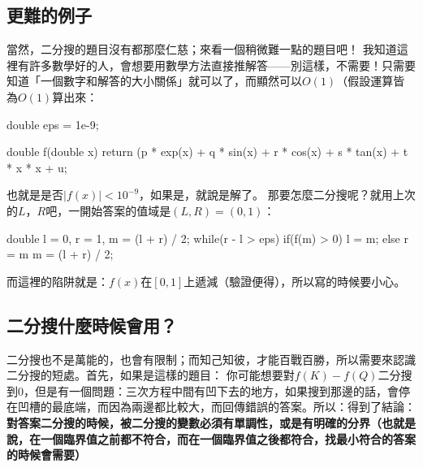 	\subsection{更難的例子}
		當然，二分搜的題目沒有都那麼仁慈；來看一個稍微難一點的題目吧！
		我知道這裡有許多數學好的人，會想要用數學方法直接推解答——別這樣，不需要！只需要知道「一個數字和解答的大小關係」就可以了，而顯然可以$O(1)$（假設運算皆為$O(1)$算出來：
		\begin{C++}
double eps = 1e-9;

double f(double x){
	return (p * exp(x) + q * sin(x) + r * cos(x) + s * tan(x) + t * x * x + u;	
}
		\end{C++}
		也就是是否$|f(x)| < 10^{-9}$，如果是，就說是解了。
		那要怎麼二分搜呢？就用上次的$L$，$R$吧，一開始答案的值域是$(L, R) = (0, 1)$：
		\begin{C++}
double l = 0, r = 1, m = (l + r) / 2;
while(r - l > eps){
	if(f(m) > 0){
		l = m;	
	} else {
		r = m
	}
	m = (l + r) / 2;
}
		\end{C++}
		而這裡的陷阱就是：$f(x)$在$[0, 1]$上遞減（驗證便得），所以寫的時候要小心。
	\subsection{二分搜什麼時候會用？}
		二分搜也不是萬能的，也會有限制；而知己知彼，才能百戰百勝，所以需要來認識二分搜的短處。首先，如果是這樣的題目：
		你可能想要對$f(K) - f(Q)$二分搜到$0$，但是有一個問題：三次方程中間有凹下去的地方，如果搜到那邊的話，會停在凹槽的最底端，而因為兩邊都比較大，而回傳錯誤的答案。所以：得到了結論：\textbf{對答案二分搜的時候，被二分搜的變數必須有單調性，或是有明確的分界（也就是說，在一個臨界值之前都不符合，而在一個臨界值之後都符合，找最小符合的答案的時候會需要）}
